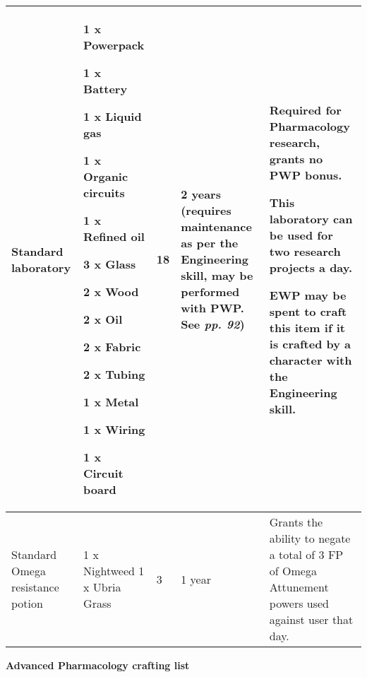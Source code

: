 \documentclass{scrbook}
\begin{document}
\begin{table}
\begin{tabular}{|l|l|l|l|l|} \hline 
Standard laboratory & 1 x Powerpack\par 1 x Battery\par 1 x Liquid gas\par 1 x Organic circuits\par 1 x Refined oil\par 3 x Glass\par 2 x Wood\par 2 x Oil\par 2 x Fabric\par 2 x Tubing\par 1 x Metal\par 1 x Wiring\par 1 x Circuit board & 18 & 2 years (requires maintenance as per the Engineering skill, may be performed with PWP. See \textit{pp. 92}) & Required for Pharmacology research, grants no PWP bonus.\par This laboratory can be used for two research projects a day.\par \textbf{EWP} may be spent to craft this item if it is crafted by a character with the Engineering skill. \\
 \hline Standard Omega resistance potion & 1 x Nightweed 1 x Ubria Grass & 3 & 1 year & Grants the ability to negate a total of 3 FP of Omega Attunement powers used against user that day. \\
 \hline \end{tabular}

\end{table}

\textbf{Advanced Pharmacology crafting list}
\end{document}
